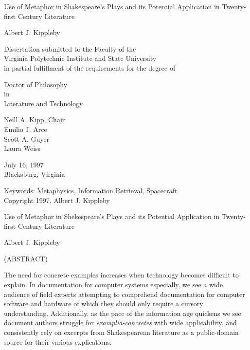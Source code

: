 \documentclass[12pt,dvips]{report}
\begin{document}
\thispagestyle{empty}
\begin{center}

{\Large 
Use of Metaphor in Shakespeare's Plays and its Potential
Application in Twenty-first Century Literature
}

\vfill

Albert J. Kippleby

\vfill

Dissertation submitted to the Faculty of the \\
Virginia Polytechnic Institute and State University \\
in partial fulfillment of the requirements for the degree of

\vfill

Doctor of Philosophy \\
in \\
Literature and Technology

\vfill

Neill A. Kipp, Chair \\
Emilio J. Arce \\
Scott A. Guyer \\
Laura Weiss

\vfill

July 16, 1997 \\
Blacksburg, Virginia

\vfill

Keywords: Metaphysics, Information Retrieval, Spacecraft
\\
Copyright 1997, Albert J. Kippleby

\end{center}

\pagebreak

\thispagestyle{empty}
\begin{center}

{\large Use of Metaphor in Shekespeare's Plays and its Potential
Application in Twenty-first Century Literature}

\vfill

Albert J. Kippleby

\vfill

(ABSTRACT)

\vfill

\end{center}

The need for concrete examples increases when technology becomes
difficult to explain.  In documentation for computer systems
especially, we see a wide audience of field experts attempting to
comprehend documentation for computer software and hardware of which
they should only require a cursory understanding.  Additionally, as
the pace of the information age quickens we see document authors
struggle for \textit{examplia-concretes} with wide applicability, and
consistently rely on excerpts from Shakespearean literature as a
public-domain source for their various explications.
\end{document}
